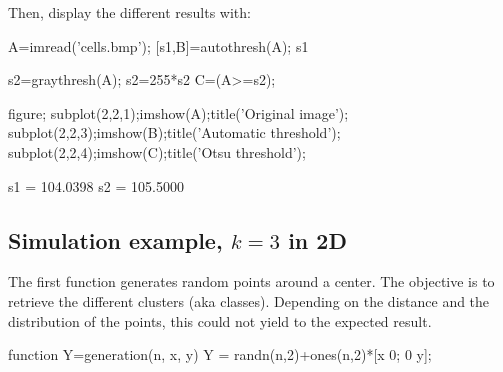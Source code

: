 Then, display the different results with:
\begin{matlab}
A=imread('cells.bmp');
[s1,B]=autothresh(A);
s1

s2=graythresh(A);
s2=255*s2
C=(A>=s2);

figure;
subplot(2,2,1);imshow(A);title('Original image');
subplot(2,2,3);imshow(B);title('Automatic threshold');
subplot(2,2,4);imshow(C);title('Otsu threshold');
\end{matlab}

\begin{mwindow}
s1 =  104.0398
s2 =  105.5000
\end{mwindow}

\begin{figure}[htbp]
 \centering
 \hspace{1cm}
 \caption{}
\end{figure}


\subsection{Simulation example, $k=3$ in 2D}
The first function generates random points around a center. The objective is to retrieve the different clusters (aka classes). Depending on the distance and the distribution of the points, this could not yield to the expected result.
\begin{matlab}
function Y=generation(n, x, y)
Y = randn(n,2)+ones(n,2)*[x 0; 0 y];
\end{matlab}

